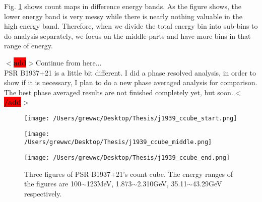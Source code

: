 \documentclass[12pt]{report}
\newcommand{\add}[1]{
  $<$\colorbox{red}{\textbf{add}}$>$#1$<$\colorbox{red}{\textbf{/add}}$>$
}
\begin{document}
          Fig. \ref{fig: j1939_count_cube} shows count maps in difference energy bands. As 
          the figure shows, the lower energy band is very messy while there is nearly nothing 
          valuable in the high energy band. Therefore, when we divide the total energy bin into 
          sub-bins to do analysis separately, we focus on the middle parts and have more bins
          in that range of energy.

          \add{Continue from here... \\
            PSR B1937+21 is a little bit different. I did a phase resolved analysis, 
            in order to show if it is necessary, I plan to do a new phase averaged analysis for 
            comparison. The best phase averaged results are not finished completely yet, but soon.}
          \begin{figure}[!ht]
            \begin{minipage}{0.32\textwidth}
              \begin{center} 
                \texttt{[image: /Users/grewwc/Desktop/Thesis/j1939\_ccube\_start.png]}
              \end{center}
            \end{minipage}
            \begin{minipage}{0.32\textwidth}
              \begin{center}
                \texttt{[image: /Users/grewwc/Desktop/Thesis/j1939\_ccube\_middle.png]}
              \end{center}
            \end{minipage}
            \begin{minipage}{0.32\textwidth}
              \begin{center}
              \texttt{[image: /Users/grewwc/Desktop/Thesis/j1939\_ccube\_end.png]}
              \end{center}
            \end{minipage}
            \caption{Three figures of PSR B1937+21's count cube. The energy ranges of the figures 
               are 100$\sim$123MeV, 1.873$\sim$2.310GeV, 35.11$\sim$43.29GeV respectively.}

            \label{fig: j1939_count_cube}
          \end{figure}
          \vspace{0.5cm}
\end{document}
